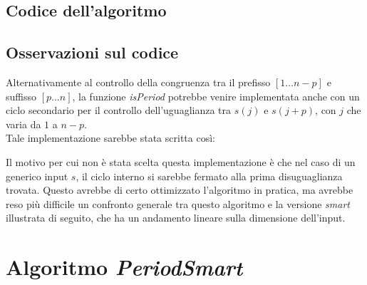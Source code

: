 \documentclass[11pt,a4paper,italian]{article}
\begin{document}
\subsection{Codice dell'algoritmo}  
 

\subsection{Osservazioni sul codice}

Alternativamente al controllo della congruenza tra il prefisso $[1 \dots n-p]$ e suffisso $[p \dots n]$, la funzione \textit{isPeriod} potrebbe venire implementata anche con un ciclo secondario per il controllo dell'uguaglianza tra $s(j)$ e $s(j+p)$, con $j$ che varia da $1$ a $n-p$.\\
Tale implementazione sarebbe stata scritta così:
 
Il motivo per cui non è stata scelta questa implementazione è che nel caso di un generico input $s$, il ciclo interno si sarebbe fermato alla prima disuguaglianza trovata. Questo avrebbe di certo ottimizzato l'algoritmo in pratica, ma avrebbe reso più difficile un confronto generale tra questo algoritmo e la versione \textit{smart} illustrata di seguito, che ha un andamento lineare sulla dimensione dell'input.


\section{Algoritmo \textit{PeriodSmart}}
\end{document}
